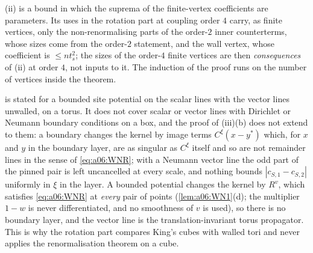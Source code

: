 \begin{remark}\label{rem:a06:WNcirc}
(ii) is a bound in which the suprema of the finite-vertex coefficients are parameters. Its uses in the rotation part at coupling order $4$ carry, as finite vertices, only the non-renormalising parts of the order-$2$ inner counterterms, whose sizes come from the order-$2$ statement, and the wall vertex, whose coefficient is $\le nt_s^2$; the sizes of the order-$4$ finite vertices are then \emph{consequences} of (ii) at order $4$, not inputs to it. The induction of the proof runs on the number of vertices inside the theorem.
\end{remark}

\begin{remark}\label{rem:a06:WNbdry}
 is stated for a bounded site potential on the scalar lines with the vector lines unwalled, on a torus. It does not cover scalar or vector lines with Dirichlet or Neumann boundary conditions on a box, and the proof of (iii)(b) does not extend to them: a boundary changes the kernel by image terms $C^\xi(x-y^*)$ which, for $x$ and $y$ in the boundary layer, are as singular as $C^\xi$ itself and so are not remainder lines in the sense of \eqref{eq:a06:WNR}; with a Neumann vector line the odd part of the pinned pair is left uncancelled at every scale, and nothing bounds $|c_{S,1}-c_{S,2}|$ uniformly in $\xi$ in the layer. A bounded potential changes the kernel by $R^v$, which satisfies \eqref{eq:a06:WNR} at \emph{every} pair of points (\cref{lem:a06:WN1}(d); the multiplier $1-w$ is never differentiated, and no smoothness of $v$ is used), so there is no boundary layer, and the vector line is the translation-invariant torus propagator. This is why the rotation part compares King's cubes with walled tori and never applies the renormalisation theorem on a cube.
\end{remark}

